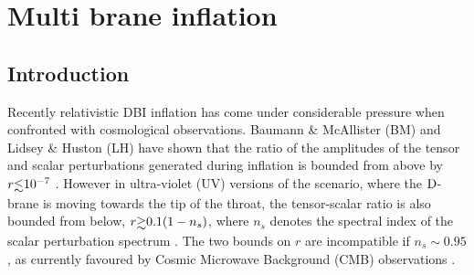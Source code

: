 \renewcommand{\CVSrevision}{\version$Id: multibrane.tex,v 1.15 2009/07/28 11:45:30 ith Exp $}

\chapter{Multi brane inflation}
\label{ch:multibrane}

\section{Introduction}
\label{sec:intro-multi}


Recently relativistic DBI inflation has come under considerable 
pressure when confronted with cosmological observations.  
Baumann \& McAllister (BM) and Lidsey \& Huston (LH) 
have shown that the ratio of the amplitudes of the 
tensor and scalar perturbations generated during 
inflation is bounded from above by $r \lsim 10^{-7}$
\cite{bmpaper,lidseyhuston}. 
However in ultra-violet (UV) versions of the scenario, where 
the ${\rm D}$-brane is moving towards the tip of the throat, the tensor-scalar 
ratio is also bounded from below, $r \gsim 0.1 (1-n_s)$, 
where $n_s$ denotes the spectral index 
of the scalar perturbation spectrum \cite{lidseyhuston}. 
The two bounds on $r$ are incompatible 
if $n_s \sim 0.95$, as currently favoured by Cosmic Microwave Background 
(CMB) observations \cite{spergel,Komatsu:2008hk}. 


